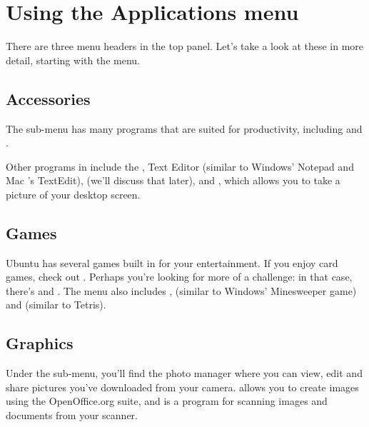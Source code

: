 \section{Using the Applications menu}
There are three menu headers in the top panel. Let's take a look at these in more detail, starting with the  menu. 

\subsection{Accessories}
The  sub-menu has many programs that are suited for productivity, including  and
.

Other programs in  include the ,  Text Editor (similar to Windows' Notepad and Mac 's TextEdit),  (we'll discuss that later), and , which allows you to take a picture of your desktop screen.

\subsection{Games}
Ubuntu has several games built in for your entertainment. If you enjoy card games, check out
. Perhaps you're looking for more of a challenge: in that case, there's
 and .  The  menu also includes ,  (similar to Windows'
Minesweeper game) and  (similar to Tetris).

\subsection{Graphics}
Under the  sub-menu, you'll find the  photo manager where you can view, edit and share pictures you've downloaded from your camera.  allows you to create images using the OpenOffice.org suite, and  is a program for scanning images and documents from your scanner.

